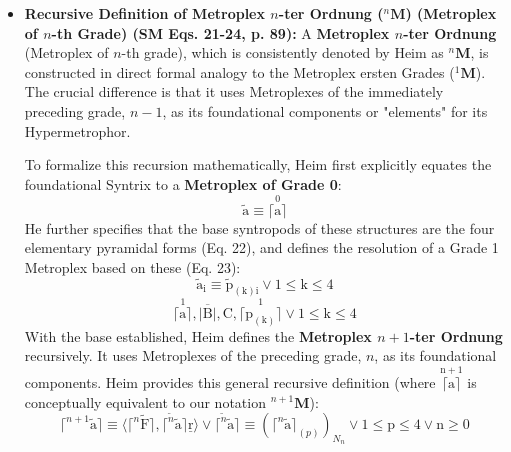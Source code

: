 \documentclass[12pt]{article}
\newcommand{\metroplex}[1]{{}^{#1}\mathbf{M}}
\newcommand{\hypersyntrix}{\metroplex{1}}
\begin{document}
\begin{itemize}
    \item \textbf{Recursive Definition of Metroplex \( n \)-ter Ordnung (\( \metroplex{n} \)) (Metroplex of \(n\)-th Grade) (SM Eqs. 21-24, p. 89):}
    A \textbf{Metroplex \( n \)-ter Ordnung} (Metroplex of \( n \)-th grade), which is consistently denoted by Heim as \( \metroplex{n} \), is constructed in direct formal analogy to the Metroplex ersten Grades (\( \hypersyntrix \)). The crucial difference is that it uses Metroplexes of the immediately preceding grade, \( n-1 \), as its foundational components or "elements" for its Hypermetrophor. 
    
    To formalize this recursion mathematically, Heim first explicitly equates the foundational Syntrix to a \textbf{Metroplex of Grade 0}:
    \begin{equation}
    \tilde{\mathrm{a}} \equiv \overset{0}{\lceil\mathrm{a}\rceil} \tag{21}
    \end{equation}
    He further specifies that the base syntropods of these structures are the four elementary pyramidal forms (Eq. 22), and defines the resolution of a Grade 1 Metroplex based on these (Eq. 23):
    \begin{equation}
    \tilde{\mathrm{a}}_{\mathrm{i}} \equiv \tilde{\mathrm{p}}_{(\mathrm{k})\mathrm{i}} \vee 1 \le \mathrm{k} \le 4 \tag{22}
    \end{equation}
    \begin{equation}
    \overset{1}{\lceil\mathrm{a}\rceil}, \overline{|\mathrm{B}|}, \mathrm{C}, \overset{1}{\lceil\mathrm{p}_{(\mathrm{k})}\rceil} \vee 1 \le \mathrm{k} \le 4 \tag{23}
    \end{equation}
    With the base established, Heim defines the \textbf{Metroplex \( n+1 \)-ter Ordnung} recursively. It uses Metroplexes of the preceding grade, \( n \), as its foundational components. Heim provides this general recursive definition (where \( \overset{\mathrm{n+1}}{\lceil\mathrm{a}\rceil} \) is conceptually equivalent to our notation \( \metroplex{n+1} \)):
    \begin{equation}
    \lceil^{n+1} \tilde{\mathrm{a}} \rceil \equiv \langle \lceil^n \tilde{\mathrm{F}} \rceil, \lceil^{\tilde{n}} \tilde{\mathrm{a}} \rceil \underline{\mathrm{r}} \rangle \vee \lceil^{\tilde{n}} \tilde{\mathrm{a}} \rceil \equiv \left( \lceil^n \tilde{\mathrm{a}} \rceil_{(p)} \right)_{N_n} \vee 1 \le \mathrm{p} \le 4 \vee \mathrm{n} \ge 0 
    \label{eq:original_metroplex_n_formal}
    \tag{24}
    \end{equation}

\end{itemize}
\end{document}
